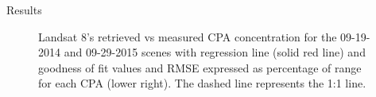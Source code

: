 \documentclass{beamer}
\begin{document}
\begin{frame}{}
\begin{columns}[t]
\begin{column}{.32\linewidth}
\begin{block}{Results}
\begin{figure}[htb]
  \caption{Landsat 8's retrieved vs measured CPA concentration for the 09-19-2014 and 09-29-2015 scenes with regression line (solid red line) and goodness of fit values and RMSE expressed as percentage of range for each CPA (lower right). The dashed line represents the 1:1 line. \label{fig:CPAsRetVSMea} } 
\end{figure}        

\vspace{-0.3cm}
\end{block}  


	


   
% 				
% 				

\end{column}
\end{columns}
\end{frame}
\end{document}
